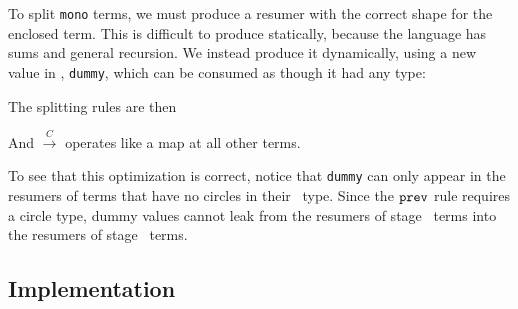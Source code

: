
To split \texttt{mono} terms, we must produce a resumer with the correct shape
for the enclosed term. This is difficult to produce statically, because the
language has sums and general recursion. We instead produce it dynamically,
using a new value in \langmono, \texttt{dummy}, which can be consumed as though
it had any type:


The splitting rules are then
And $\overset{C}{\rightarrow}$ operates like a map at all other terms.

To see that this optimization is correct, notice that \texttt{dummy} can only
appear in the resumers of terms that have no circles in their \lang\ type.
Since the ${\tt prev}$ rule requires a circle type, dummy values cannot leak from the
resumers of stage \bbone\ terms into the resumers of stage \bbtwo\ terms.



\subsection{Implementation}


